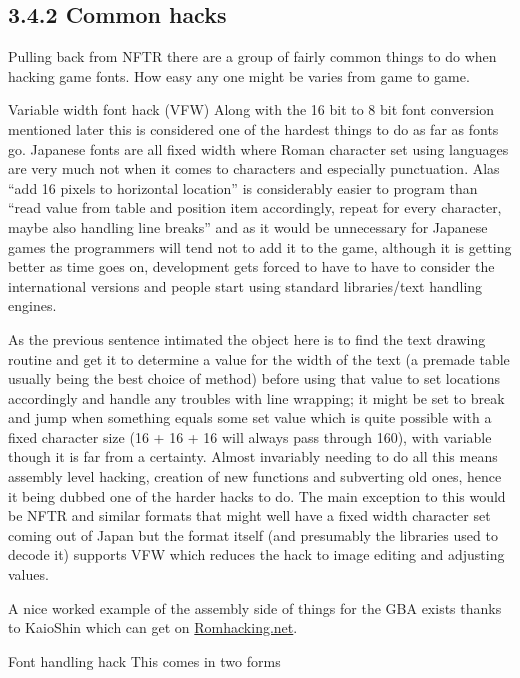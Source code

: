 \documentclass[
]{book}
\begin{document}
\hypertarget{common-hacks}{%
\subsection{3.4.2 Common hacks}\label{common-hacks}}

Pulling back from NFTR there are a group of fairly common things to do when hacking game fonts. How easy any one might be varies from game to game.

Variable width font hack (VFW) Along with the 16 bit to 8 bit font conversion mentioned later this is considered one of the hardest things to do as far as fonts go. Japanese fonts are all fixed width where Roman character set using languages are very much not when it comes to characters and especially punctuation. Alas ``add 16 pixels to horizontal location'' is considerably easier to program than ``read value from table and position item accordingly, repeat for every character, maybe also handling line breaks'' and as it would be unnecessary for Japanese games the programmers will tend not to add it to the game, although it is getting better as time goes on, development gets forced to have to have to consider the international versions and people start using standard libraries/text handling engines.

As the previous sentence intimated the object here is to find the text drawing routine and get it to determine a value for the width of the text (a premade table usually being the best choice of method) before using that value to set locations accordingly and handle any troubles with line wrapping; it might be set to break and jump when something equals some set value which is quite possible with a fixed character size (16 + 16 + 16 will always pass through 160), with variable though it is far from a certainty. Almost invariably needing to do all this means assembly level hacking, creation of new functions and subverting old ones, hence it being dubbed one of the harder hacks to do. The main exception to this would be NFTR and similar formats that might well have a fixed width character set coming out of Japan but the format itself (and presumably the libraries used to decode it) supports VFW which reduces the hack to image editing and adjusting values.

A nice worked example of the assembly side of things for the GBA exists thanks to KaioShin which can get on \href{http://www.romhacking.net/documents/337/}{Romhacking.net}.

Font handling hack This comes in two forms
\end{document}
